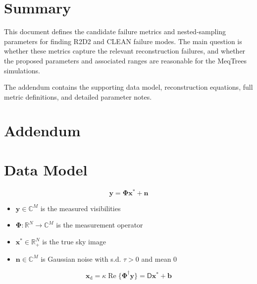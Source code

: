 \documentclass[11pt]{article}
\newcommand{\D}{\boldsymbol{\mathsf D}}
\newcommand{\dirty}{\boldsymbol x_{\text{d}}}
\newcommand{\true}{\boldsymbol{x^{*}}}
\newcommand{\noise}{\boldsymbol{b}}
\begin{document}
\section{Summary}

This document defines the candidate failure metrics and nested-sampling parameters for finding R2D2 and CLEAN failure modes.
The main question is whether these metrics capture the relevant reconstruction failures, and whether the proposed parameters and associated ranges are reasonable for the MeqTrees simulations.

The addendum contains the supporting data model, reconstruction equations, full metric definitions, and detailed parameter notes.

\appendix
\section*{Addendum}

\section{Data Model}
\label{sec:data-model}

\begin{equation}
\boldsymbol y = \boldsymbol\Phi \true + \boldsymbol n
\end{equation}
\begin{itemize}
    \item $\boldsymbol y\in \mathbb C^M$ is the measured visibilities
    \item $\boldsymbol\Phi: \mathbb R^N \to \mathbb C^M$  is the measurement operator
    \item $\true\in\mathbb R_+^N$ is the true sky image
    \item $\boldsymbol n\in\mathbb C^M$ is Gaussian noise with s.d. $\tau>0$ and mean $0$
\end{itemize}

\begin{equation}
\dirty = \kappa\operatorname{Re}\{\boldsymbol\Phi^\dagger \boldsymbol y\} = \D\true + \noise
\end{equation}
\end{document}
